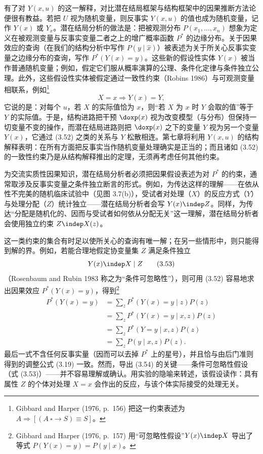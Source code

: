有了对 $Y(x,u)$ 的这一解释，对比潜在结局框架与结构框架中的因果推断方法论便很有教益。若把 $U$ 视为随机变量，则反事实 $Y(x,u)$ 的值也成为随机变量，记作 $Y(x)$ 或 $Y_x$。潜在结局分析的做法是：把被观测分布 $P(x_1,\dots,x_n)$ 想象为定义在被观测变量与反事实变量二者之上的增广概率函数 $P^*$ 的边缘分布。关于因果效应的查询（在我们的结构分析中写作 $P(y\mid\hat{x})$）被表述为关于所关心反事实变量之边缘分布的查询，写作 $P^*(Y(x)=y)$。这些新的假设性实体 $Y(x)$ 被当作普通随机变量；例如，假定它们服从概率演算的公理、条件化定律与条件独立公理。此外，这些假设性实体被假定通过一致性约束（Robins 1986）与可观测变量相联系，例如\footnote{Gibbard and Harper (1976, p.~156) 把这一约束表述为 $A\Rightarrow[(A\ \square\!\!\to S)\equiv S]$。}
\begin{equation}
X=x\Rightarrow Y(x)=Y, \tag{3.52}
\end{equation}
它说的是：对每个 $u$，若 $X$ 的实际值恰为 $x$，则“若 $X$ 为 $x$ 时 $Y$ 会取的值”等于 $Y$ 的实际值。于是，结构进路把干预 $\doxp(x)$ 视为改变模型（与分布）但保持一切变量不变的操作，而潜在结局进路则把 $\doxp(x)$ 之下的变量 $Y$ 视为另一个变量 $Y(x)$，它通过 \textup{(3.52)} 之类的关系与 $Y$ 松散相连。第七章将利用 $Y(x,u)$ 的结构解释表明：在所有方面把反事实当作随机变量处理确实是正当的；而且诸如 \textup{(3.52)} 的一致性约束乃是从结构解释推出的定理，无须再考虑任何其他约束。

为交流实质性因果知识，潜在结局分析者必须把因果假设表述为对 $P^*$ 的约束，通常取涉及反事实变量之条件独立断言的形式。例如，为传达这样的理解——在依从性不完美的随机临床试验中（见图 3.7(b)），受试者对处理（$X$）的反应方式（$Y$）与处理分配（$Z$）统计独立——潜在结局分析者会写 $Y(x)\indep Z$。同样，为传达“分配是随机化的、因而与受试者如何依从分配无关”这一理解，潜在结局分析者会使用独立约束 $Z\indep X(z)$。

这一类约束的集合有时足以使所关心的查询有唯一解；在另一些情形中，则只能得到解的界。例如，若能合理地假定协变量集 $Z$ 满足条件独立
\begin{equation}
Y(x)\indep X\mid Z \tag{3.53}
\end{equation}
（Rosenbaum and Rubin 1983 称之为“条件可忽略性”），则可用 \textup{(3.52)} 容易地求出因果效应 $P^*(Y(x)=y)$，得到\footnote{Gibbard and Harper (1976, p.~157) 用“可忽略性假设”$Y(x)\indep X$ 导出了等式 $P(Y(x)=y)=P(y\mid x)$。}
\begin{equation}
\begin{aligned}
P^*(Y(x)=y) &= \sum_{z}P^*(Y(x)=y\mid z)P(z)\\
&= \sum_{z}P^*(Y(x)=y\mid x,z)P(z)\\
&= \sum_{z}P^*(Y=y\mid x,z)P(z)\\
&= \sum_{z}P(y\mid x,z)P(z).
\end{aligned} \tag{3.54}
\end{equation}
最后一式不含任何反事实量（因而可以去掉 $P^*$ 上的星号），并且恰与由后门准则得到的调整公式 \textup{(3.19)} 一致。然而，导出 \textup{(3.54)} 的关键——条件可忽略性假设（式 \textup{(3.53)}）——并不容易理解或确认。用实验的隐喻来转述，该假设读作：具有属性 $Z$ 的个体对处理 $X=x$ 会作出的反应，与该个体实际接受的处理无关。

